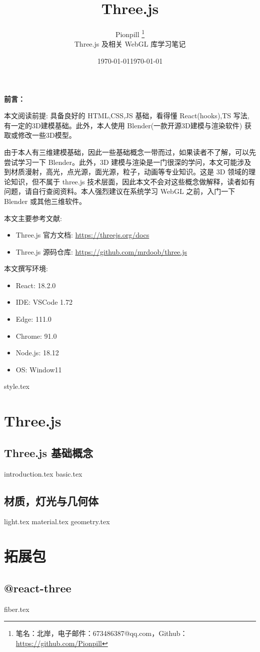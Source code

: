 \documentclass{PionpillNote-book}
\title{Three.js}
\author{
    Pionpill \footnote{笔名：北岸，电子邮件：673486387@qq.com，Github：\url{https://github.com/Pionpill}} \\
    Three.js 及相关 WebGL 库学习笔记\\
}
\date{\today}
\begin{document}
\pagestyle{plain}
\maketitle

\noindent\textbf{前言：}

本文阅读前提: 具备良好的 HTML,CSS,JS 基础，看得懂 React(hooks),TS 写法, 有一定的3D建模基础。此外，本人使用 Blender(一款开源3D建模与渲染软件) 获取或修改一些3D模型。

由于本人有三维建模基础，因此一些基础概念一带而过，如果读者不了解，可以先尝试学习一下 Blender。此外，3D 建模与渲染是一门很深的学问，本文可能涉及到材质漫射，高光，点光源，面光源，粒子，动画等专业知识。这是 3D 领域的理论知识，但不属于 three.js 技术层面，因此本文不会对这些概念做解释，读者如有问题，请自行查阅资料。本人强烈建议在系统学习 WebGL 之前，入门一下 Blender 或其他三维软件。

本文主要参考文献:
\begin{itemize}
    \item Three.js 官方文档: \url{https://threejs.org/docs}
    \item Three.js 源码仓库: \url{https://github.com/mrdoob/three.js}
\end{itemize}

本文撰写环境:

\begin{itemize}
    \item React: 18.2.0
    \item IDE: VSCode 1.72 
    \item Edge: 111.0
    \item Chrome: 91.0
    \item Node.js: 18.12
    \item OS: Window11
\end{itemize}

\date{\today}
\newpage

\tableofcontents

\newpage

\setcounter{page}{1} 
\pagestyle{fancy}

{style.tex}
\part{Three.js}
\chapter{Three.js 基础概念}
{introduction.tex}
{basic.tex}
\chapter{材质，灯光与几何体}
{light.tex}
{material.tex}
{geometry.tex}
\part{拓展包}
\chapter{@react-three}
{fiber.tex}
\end{document}

